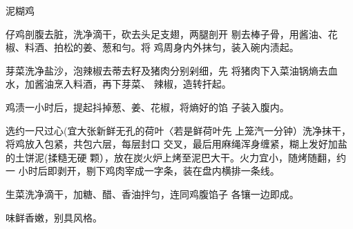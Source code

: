 \begin{recipe}[叫化鸡]{泥糊鸡}

\ingredients




\cooking

\step 	仔鸡剖腹去脏，洗净滴干，砍去头足支翅，两腿剖开 剔去棒子骨，用酱油、花椒、料酒、拍松的姜、葱和勻。将 鸡周身内外抹匀，装入碗内渍起。

\step 	芽菜洗净盐沙，泡辣椒去蒂去籽及猪肉分别剁细，先 将猪肉下入菜油锅熵去血水，加酱油烹入料酒，再下芽菜、 辣椒，造转扞起。

\step 	鸡渍一小时后，提起抖掉葱、姜、花椒，将熵好的馅 子装入腹内。

\step 	选约一尺过心(宜大张新鲜无孔的荷叶〈若是鲜荷叶先 上笼汽一分钟）洗净抹干，将鸡放入包紧，共包六层，每层封口 交叉，最后用麻绳浑身缠紧，糊上发好加盐的土饼泥(揉糙无硬 颗），放在炭火炉上烤至泥巴大干。火力宜小，随烤随翻，约一 小时后即剥开，剔下鸡肉宰成一字条，装在盘内横排一条线。

\step 生菜洗净滴干，加糖、醋、香油拌匀，连同鸡腹馅子 各镶一边即成。

\notes

味鲜香嫩，别具风格。

\end{recipe}

